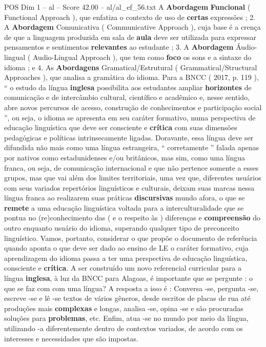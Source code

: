 \begin{textsample}{POS Dim 1 – al – Score 42.00 – al/al\_ef\_56.txt}
A \textbf{Abordagem} \textbf{Funcional} ( Functional Approach ), que enfatiza o contexto de uso de \textbf{certas} expressões ; 2.
A \textbf{Abordagem} Comunicativa ( Communicative Approach ), cuja base é a crença de que a linguagem produzida em sala de \textbf{aula} deve ser utilizada para expressar pensamentos e sentimentos \textbf{relevantes} ao estudante ; 3.
A \textbf{Abordagem} Áudio-lingual ( Audio-Lingual Approach ), que tem como \textbf{foco} os sons e a sintaxe do idioma ; e 4.
As \textbf{Abordagens} Gramatical/Estrutural ( Grammatical/Structural Approaches ), que analisa a gramática do idioma.
Para a BNCC ( 2017, p. 119 ), “ o estudo da língua \textbf{inglesa} possibilita aos estudantes ampliar \textbf{horizontes} de comunicação e de intercâmbio cultural, científico e acadêmico e, nesse sentido, abre novos percursos de acesso, construção de conhecimentos e participação social ”, ou seja, o idioma se apresenta em seu caráter formativo, numa perspectiva de educação linguística que deve ser consciente e \textbf{crítica} com suas dimensões pedagógicas e políticas intrinsecamente ligadas.
Doravante, essa língua deve ser difundida não mais como uma língua estrangeira, “ corretamente ” falada apenas por nativos como estadunidenses e/ou britânicos, mas sim, como uma língua franca, ou seja, de comunicação internacional e que não pertence somente a esses grupos, mas que vai além dos limites territoriais, uma vez que, diferentes usuários com seus variados repertórios linguísticos e culturais, deixam suas marcas nessa língua franca ao realizarem suas práticas \textbf{discursivas} mundo afora, o que se \textbf{remete} a uma educação linguística voltada para a interculturalidade que se pontua no (re)conhecimento das ( e o respeito às ) diferenças e \textbf{compreensão} do outro enquanto usuário do idioma, superando qualquer tipo de preconceito linguístico.
Vamos, portanto, considerar o que propõe o documento de referência quando aponta o que deve ser dado ao ensino de LE o caráter formativo, cuja aprendizagem do idioma passa a ter uma perspectiva de educação linguística, consciente e \textbf{crítica}.
A ser construído um novo referencial curricular para a língua \textbf{inglesa}, à luz da BNCC para Alagoas, é importante que se pergunte : o que se faz com com uma língua?
A resposta a isso é : Conversa -se, pergunta -se, escreve -se e lê -se textos de vários gêneros, desde escritos de placas de rua até produções mais \textbf{complexas} e longas, analisa -se, opina -se e são procuradas soluções para \textbf{problemas}, etc.
Enfim, atua -se no mundo por meio da língua, utilizando -a diferentemente dentro de contextos variados, de acordo com os interesses e necessidades que são impostas.

\end{textsample}
